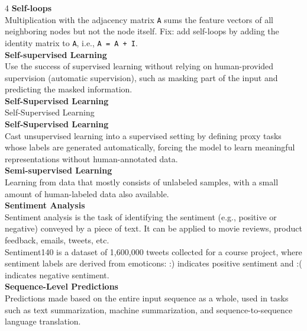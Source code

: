 \documentclass[8pt]{extarticle}
\begin{document}
\begin{multicols}{4}
{\vspace{2pt}\textbf{Self-loops}\\
Multiplication with the adjacency matrix \texttt{A} sums the feature vectors of all neighboring nodes but not the node itself. Fix: add self-loops by adding the identity matrix to \texttt{A}, i.e., \texttt{A = A + I}.\\
\vspace{2pt}\textbf{Self-supervised Learning}\\
Use the success of supervised learning without relying on human-provided supervision (automatic supervision), such as masking part of the input and predicting the masked information.\\
\vspace{2pt}\textbf{Self-Supervised Learning}\\
Self-Supervised Learning\\
\vspace{2pt}\textbf{Self‑Supervised Learning}\\
Cast unsupervised learning into a supervised setting by defining proxy tasks whose labels are generated automatically, forcing the model to learn meaningful representations without human-annotated data.\\
\vspace{2pt}\textbf{Semi-supervised Learning}\\
Learning from data that mostly consists of unlabeled samples, with a small amount of human-labeled data also available.\\
\vspace{2pt}\textbf{Sentiment Analysis}\\
Sentiment analysis is the task of identifying the sentiment (e.g., positive or negative) conveyed by a piece of text. It can be applied to movie reviews, product feedback, emails, tweets, etc.\\
Sentiment140 is a dataset of 1,600,000 tweets collected for a course project, where sentiment labels are derived from emoticons: :) indicates positive sentiment and :( indicates negative sentiment.\\
\vspace{2pt}\textbf{Sequence-Level Predictions}\\
Predictions made based on the entire input sequence as a whole, used in tasks such as text summarization, machine summarization, and sequence-to-sequence language translation.\\

}
\end{multicols}
\end{document}
